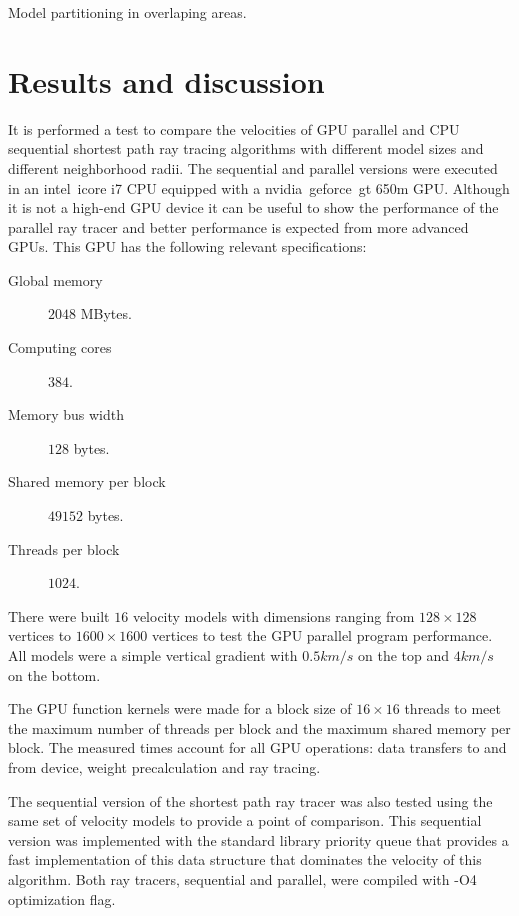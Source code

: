 {Model partitioning in overlaping areas.}

\section*{Results and discussion}

It is performed a test to compare the velocities of GPU 
parallel and CPU sequential shortest path ray tracing 
algorithms with different model sizes and different 
neighborhood radii.
The sequential and parallel versions were executed in 
an intel\textregistered\ icore\textsuperscript{\texttrademark} i7 CPU 
equipped with a nvidia\textregistered\ geforce\textregistered\ gt 
650m GPU. Although it is not a high-end GPU device it 
can be useful to show the performance of the parallel 
ray tracer and better performance is expected from more
advanced GPUs. This GPU has the following relevant specifications:

\begin{description}
 \item[Global memory] $2048$ MBytes.
 \item[Computing cores] $384$.
 \item[Memory bus width] $128$ bytes.
 \item[Shared memory per block] $49152$ bytes.
 \item[Threads per block] $1024$.
\end{description}

There were built $16$ velocity models with dimensions
ranging from $128\times 128$ vertices to $1600\times 1600$
vertices to test the GPU parallel program performance. All 
models were a simple vertical gradient with $0.5km/s$ on the 
top and $4km/s$ on the bottom.

The GPU function kernels were made for a block size of 
$16\times 16$ threads to meet the maximum number of threads 
per block and the maximum shared memory per block. The measured
times account for all GPU operations: data transfers to
and from device, weight precalculation and ray tracing. 

The 
sequential version of the shortest path ray tracer was 
also tested using the same set of velocity models to 
provide a point of comparison. This sequential version
was implemented with the standard library priority queue
that provides a fast implementation of this data structure
that dominates the velocity of this algorithm.
Both ray tracers, sequential and parallel, were compiled with 
-O4 optimization flag.

